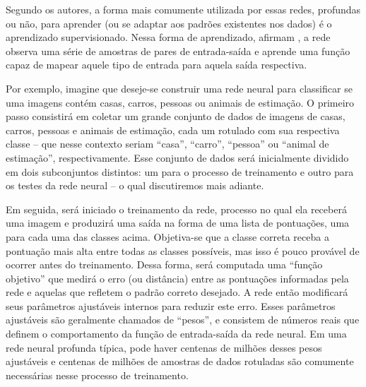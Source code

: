 Segundo os autores, a forma mais comumente utilizada por essas redes, profundas ou não, para aprender (ou se adaptar aos padrões existentes nos dados) é o aprendizado supervisionado.
Nessa forma de aprendizado, afirmam , a rede observa uma série de amostras de pares de entrada-saída e aprende uma função capaz de mapear aquele tipo de entrada para aquela saída respectiva.

Por exemplo, imagine que deseje-se construir uma rede neural para classificar se uma imagens contém casas, carros, pessoas ou animais de estimação. O primeiro passo consistirá em coletar um grande conjunto de dados de imagens de casas, carros, pessoas e animais de estimação, cada um rotulado com sua respectiva classe -- que nesse contexto seriam ``casa'', ``carro'', ``pessoa'' ou ``animal de estimação'', respectivamente.
Esse conjunto de dados será inicialmente dividido em dois subconjuntos distintos: um para o processo de treinamento e outro para os testes da rede neural -- o qual discutiremos mais adiante.

Em seguida, será iniciado o treinamento da rede, processo no qual ela receberá uma imagem e produzirá uma saída na forma de uma lista de pontuações, uma para cada uma das classes acima. Objetiva-se que a classe correta receba a pontuação mais alta entre todas as classes possíveis, mas isso é pouco provável de ocorrer antes do treinamento. Dessa forma, será computada uma ``função objetivo'' que medirá o erro (ou distância) entre as pontuações informadas pela rede e aquelas que refletem o padrão correto desejado.
A rede então modificará seus parâmetros ajustáveis internos para reduzir este erro. Esses parâmetros ajustáveis são geralmente chamados de ``pesos'', e consistem de números reais que definem o comportamento da função de entrada-saída da rede neural. 
Em uma rede neural profunda típica, pode haver centenas de milhões desses pesos ajustáveis e centenas de milhões de amostras de dados rotuladas são comumente necessárias nesse processo de treinamento.


